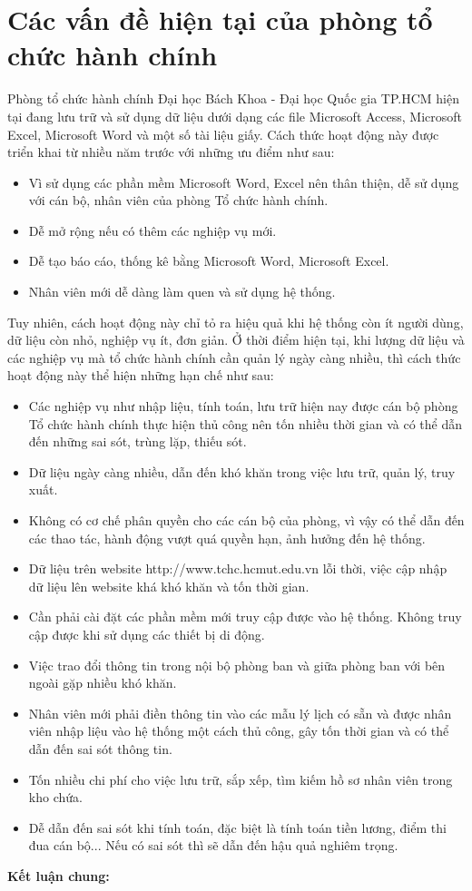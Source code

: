 \section{Các vấn đề hiện tại của phòng tổ chức hành chính}
Phòng tổ chức hành chính Đại học Bách Khoa - Đại học Quốc gia TP.HCM hiện tại đang lưu trữ và sử dụng dữ liệu dưới dạng các file Microsoft Access, Microsoft Excel, Microsoft Word và một số tài liệu giấy. Cách thức hoạt động này được triển khai từ nhiều năm trước với những ưu điểm như sau:
\begin{itemize}
    \item Vì sử dụng các phần mềm Microsoft Word, Excel nên thân thiện, dễ sử dụng với cán bộ, nhân viên của phòng Tổ chức hành chính.
    \item Dễ mở rộng nếu có thêm các nghiệp vụ mới.
    \item Dễ tạo báo cáo, thống kê bằng Microsoft Word, Microsoft Excel.
    \item Nhân viên mới dễ dàng làm quen và sử dụng hệ thống.
\end{itemize}
Tuy nhiên, cách hoạt động này chỉ tỏ ra hiệu quả khi hệ thống còn ít người dùng, dữ liệu còn nhỏ, nghiệp vụ ít, đơn giản. Ở thời điểm hiện tại, khi lượng dữ liệu và các nghiệp vụ mà tổ chức hành chính cần quản lý ngày càng nhiều, thì cách thức hoạt động này thể hiện những hạn chế như sau: 
\begin{itemize}
    \item Các nghiệp vụ như nhập liệu, tính toán, lưu trữ hiện nay được cán bộ phòng Tổ chức hành chính thực hiện thủ công nên tốn nhiều thời gian và có thể dẫn đến những sai sót, trùng lặp, thiếu sót.
    \item Dữ liệu ngày càng nhiều, dẫn đến khó khăn trong việc lưu trữ, quản lý, truy xuất.
    \item Không có cơ chế phân quyền cho các cán bộ của phòng, vì vậy có thể dẫn đến các thao tác, hành động vượt quá quyền hạn, ảnh hưởng đến hệ thống. 
    \item Dữ liệu trên website http://www.tchc.hcmut.edu.vn lỗi thời, việc cập nhập dữ liệu lên website khá khó khăn và tốn thời gian.
    \item Cần phải cài đặt các phần mềm mới truy cập được vào hệ thống. Không truy cập được khi sử dụng các thiết bị di động.
    \item Việc trao đổi thông tin trong nội bộ phòng ban và giữa phòng ban với bên ngoài gặp nhiều khó khăn.
    \item Nhân viên mới phải điền thông tin vào các mẫu lý lịch có sẵn và được nhân viên nhập liệu vào hệ thống một cách thủ công, gây tốn thời gian và có thể dẫn đến sai sót thông tin.
    \item Tốn nhiều chi phí cho việc lưu trữ, sắp xếp, tìm kiếm hồ sơ nhân viên trong kho chứa.
    \item Dễ dẫn đến sai sót khi tính toán, đặc biệt là tính toán tiền lương, điểm thi đua cán bộ... Nếu có sai sót thì sẽ dẫn đến hậu quả nghiêm trọng.
\end{itemize}
\textbf{Kết luận chung:}

